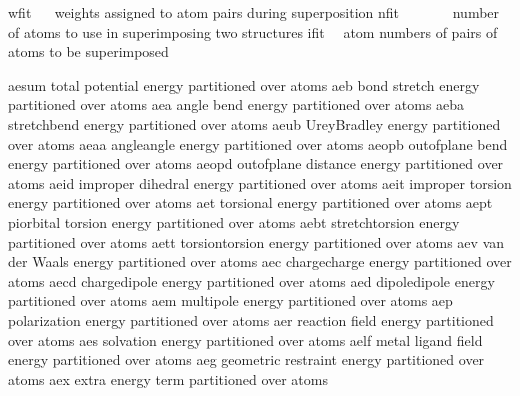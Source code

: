 \documentclass[letterpaper,11pt,english]{sphinxmanual}
\begin{document}

\begin{sphinxVerbatim}[commandchars=\\\{\}]
wfit            weights assigned to atom pairs during superposition
nfit            number of atoms to use in superimposing two structures
ifit            atom numbers of pairs of atoms to be superimposed
\end{sphinxVerbatim}


\begin{sphinxVerbatim}[commandchars=\\\{\}]
aesum           total potential energy partitioned over atoms
aeb             bond stretch energy partitioned over atoms
aea             angle bend energy partitioned over atoms
aeba            stretch\PYGZhy{}bend energy partitioned over atoms
aeub            Urey\PYGZhy{}Bradley energy partitioned over atoms
aeaa            angle\PYGZhy{}angle energy partitioned over atoms
aeopb           out\PYGZhy{}of\PYGZhy{}plane bend energy partitioned over atoms
aeopd           out\PYGZhy{}of\PYGZhy{}plane distance energy partitioned over atoms
aeid            improper dihedral energy partitioned over atoms
aeit            improper torsion energy partitioned over atoms
aet             torsional energy partitioned over atoms
aept            pi\PYGZhy{}orbital torsion energy partitioned over atoms
aebt            stretch\PYGZhy{}torsion energy partitioned over atoms
aett            torsion\PYGZhy{}torsion energy partitioned over atoms
aev             van der Waals energy partitioned over atoms
aec             charge\PYGZhy{}charge energy partitioned over atoms
aecd            charge\PYGZhy{}dipole energy partitioned over atoms
aed             dipole\PYGZhy{}dipole energy partitioned over atoms
aem             multipole energy partitioned over atoms
aep             polarization energy partitioned over atoms
aer             reaction field energy partitioned over atoms
aes             solvation energy partitioned over atoms
aelf            metal ligand field energy partitioned over atoms
aeg             geometric restraint energy partitioned over atoms
aex             extra energy term partitioned over atoms
\end{sphinxVerbatim}

\end{document}
